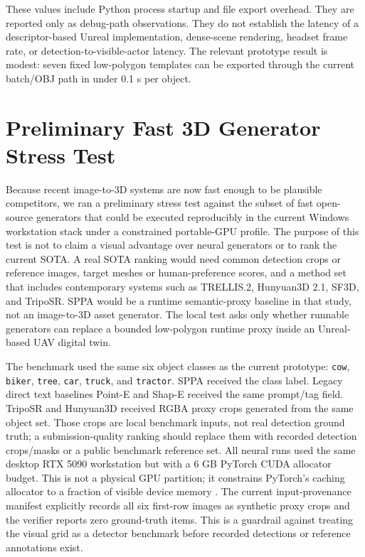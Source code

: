﻿\documentclass[11pt,a4paper]{article}
\begin{document}
These values include Python process startup and file export overhead. They are
reported only as debug-path observations. They do not establish the latency of a
descriptor-based Unreal implementation, dense-scene rendering, headset frame
rate, or detection-to-visible-actor latency. The relevant prototype result is modest: seven fixed
low-polygon templates can be exported through the current batch/OBJ path in
under 0.1 s per object.

\section{Preliminary Fast 3D Generator Stress Test}

Because recent image-to-3D systems are now fast enough to be plausible
competitors, we ran a preliminary stress test against the subset of fast
open-source generators that could be executed reproducibly in the current
Windows workstation stack under a constrained portable-GPU profile. The purpose
of this test is not to claim a visual advantage over neural generators or to
rank the current SOTA. A real SOTA ranking would need common detection crops or
reference images, target meshes or human-preference scores, and a method set
that includes contemporary systems such as TRELLIS.2, Hunyuan3D 2.1, SF3D, and
TripoSR. SPPA would be a runtime semantic-proxy baseline in that study, not an
image-to-3D asset generator. The local test asks only whether runnable generators
can replace a bounded low-polygon runtime proxy inside an Unreal-based UAV
digital twin.

The benchmark used the same six object classes as the current prototype:
\texttt{cow}, \texttt{biker}, \texttt{tree}, \texttt{car}, \texttt{truck}, and
\texttt{tractor}. SPPA received the class label. Legacy direct text baselines
Point-E and Shap-E received the same prompt/tag field. TripoSR and Hunyuan3D
received RGBA proxy crops generated from the same object set. Those crops are
local benchmark inputs, not real detection ground truth; a submission-quality
ranking should replace them with recorded detection crops/masks or a public
benchmark reference set. All neural runs used the same desktop RTX
5090 workstation but with a 6 GB PyTorch CUDA allocator budget. This is not a
physical GPU partition; it constrains PyTorch's caching allocator to a fraction
of visible device memory \cite{pytorch2026memoryfraction}.
The current input-provenance manifest explicitly records all six first-row
images as synthetic proxy crops and the verifier reports zero ground-truth
items. This is a guardrail against treating the visual grid as a detector
benchmark before recorded detections or reference annotations exist.
\end{document}
